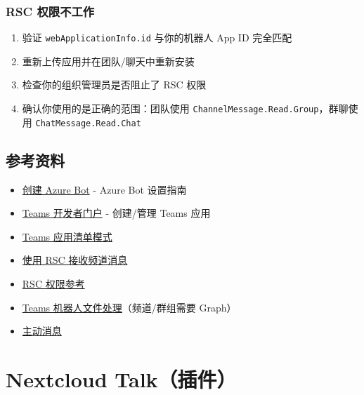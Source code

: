 \subsubsection{RSC 权限不工作}


\begin{enumerate}
  \item 验证 \texttt{webApplicationInfo.id} 与你的机器人 App ID 完全匹配
  \item 重新上传应用并在团队/聊天中重新安装
  \item 检查你的组织管理员是否阻止了 RSC 权限
  \item 确认你使用的是正确的范围：团队使用 \texttt{ChannelMessage.Read.Group}，群聊使用 \texttt{ChatMessage.Read.Chat}
\end{enumerate}


\subsection{参考资料}


\begin{itemize}
  \item \href{https://learn.microsoft.com/en-us/azure/bot-service/bot-service-quickstart-registration}{创建 Azure Bot} - Azure Bot 设置指南
  \item \href{https://dev.teams.microsoft.com/apps}{Teams 开发者门户} - 创建/管理 Teams 应用
  \item \href{https://learn.microsoft.com/en-us/microsoftteams/platform/resources/schema/manifest-schema}{Teams 应用清单模式}
  \item \href{https://learn.microsoft.com/en-us/microsoftteams/platform/bots/how-to/conversations/channel-messages-with-rsc}{使用 RSC 接收频道消息}
  \item \href{https://learn.microsoft.com/en-us/microsoftteams/platform/graph-api/rsc/resource-specific-consent}{RSC 权限参考}
  \item \href{https://learn.microsoft.com/en-us/microsoftteams/platform/bots/how-to/bots-filesv4}{Teams 机器人文件处理}（频道/群组需要 Graph）
  \item \href{https://learn.microsoft.com/en-us/microsoftteams/platform/bots/how-to/conversations/send-proactive-messages}{主动消息}
\end{itemize}



\clearpage

\section{Nextcloud Talk（插件）}


